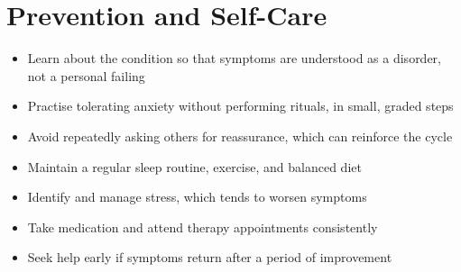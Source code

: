 \section*{Prevention and Self-Care}
\begin{itemize}
    \item Learn about the condition so that symptoms are understood as a disorder, not a personal failing
    \item Practise tolerating anxiety without performing rituals, in small, graded steps
    \item Avoid repeatedly asking others for reassurance, which can reinforce the cycle
    \item Maintain a regular sleep routine, exercise, and balanced diet
    \item Identify and manage stress, which tends to worsen symptoms
    \item Take medication and attend therapy appointments consistently
    \item Seek help early if symptoms return after a period of improvement
\end{itemize}
